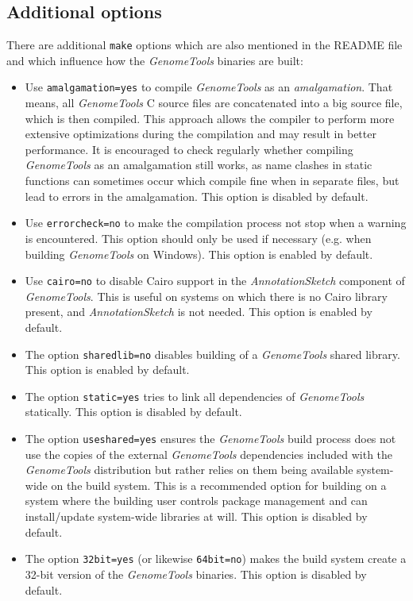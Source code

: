 \documentclass[11pt,final]{article}
\newcommand{\keyword}[1]{\lstinline{#1}}
\newcommand{\Gt}[0]{\emph{GenomeTools}\xspace}
\begin{document}
\subsection{Additional options}
There are additional \keyword{make} options which are also mentioned in the
README file and which influence how the \Gt binaries are built:
\begin{itemize}
\item
Use \keyword{amalgamation=yes} to compile \Gt as an \emph{amalgamation}. That
means, all \Gt C source files are concatenated into a big source file, which is
then compiled. This approach allows the compiler to perform more extensive
optimizations during the compilation and may result in better performance.
It is encouraged to check regularly whether compiling \Gt as an amalgamation
still works, as name clashes in static functions can sometimes occur which
compile fine when in separate files, but lead to errors in the amalgamation.
This option is disabled by default.
\item
Use \keyword{errorcheck=no} to make the compilation process not stop when a
warning is encountered. This option should only be used if necessary (e.g.\@
when building \Gt on Windows). This option is enabled by default.
\item
Use \keyword{cairo=no} to disable Cairo support in the \emph{AnnotationSketch}
component of \Gt . This is useful on systems on which there is no Cairo library
present, and \emph{AnnotationSketch} is not needed. This option is enabled by
default.
\item
The option \keyword{sharedlib=no} disables building of a \Gt shared library.
This option is enabled by default.
\item
The option \keyword{static=yes} tries to link all dependencies of \Gt
statically. This option is disabled by default.
\item
The option \keyword{useshared=yes} ensures the \Gt build process does not use
the copies of the external \Gt dependencies included with the \Gt distribution
but rather relies on them being available system-wide on the build system.
This is a recommended option for building on a system where the building user
controls package management and can install/update system-wide libraries at will.
This option is disabled by default.
\item
The option \keyword{32bit=yes} (or likewise \keyword{64bit=no}) makes the build
system create a 32-bit version of the \Gt binaries. This option is disabled by
default.
\end{itemize}
\end{document}

